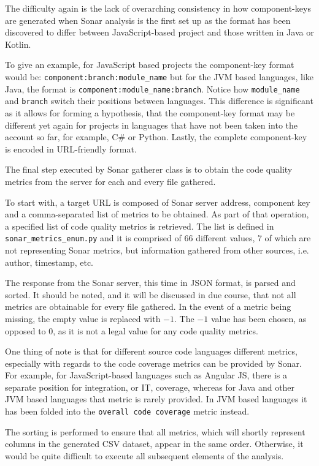 The difficulty again is the lack of overarching consistency in how component-keys are generated when Sonar analysis is the first set up as the format has been discovered to differ between JavaScript-based project and those written in Java or Kotlin.

To give an example, for JavaScript based projects the component-key format would be:
\texttt{component:branch:module\_name} but for the JVM based languages, like Java, the format is
\texttt{component:module\_name:branch}.
Notice how \texttt{module\_name} and \texttt{branch} switch their positions between languages.
This difference is significant as it allows for forming a hypothesis, that the component-key format may be different yet again for projects in languages that have not been taken into the account so far, for example, C\# or Python.
Lastly, the complete component-key is encoded in URL-friendly format.

The final step executed by Sonar gatherer class is to obtain the code quality metrics from the server for each and every file gathered. 

To start with, a target URL is composed of Sonar server address, component key and a comma-separated list of metrics to be obtained. As part of that operation, a specified list of code quality metrics is retrieved. The list is defined in \texttt{sonar\_metrics\_enum.py} and it is comprised of 66 different values, 7 of which are not representing Sonar metrics, but information gathered from other sources, i.e. author, timestamp, etc. 

The response from the Sonar server, this time in JSON format, is parsed and sorted. It should be noted, and it will be discussed in due course, that not all metrics are obtainable for every file gathered. In the event of a metric being missing, the empty value is replaced with $-1$. The $-1$ value has been chosen, as opposed to $0$, as it is not a legal value for any code quality metrics. 

One thing of note is that for different source code languages different metrics, especially with regards to the code coverage metrics can be provided by Sonar. For example, for JavaScript-based languages such as Angular JS, there is a separate position for integration, or IT, coverage, whereas for Java and other JVM based languages that metric is rarely provided. In JVM based languages it has been folded into the \texttt{overall code coverage} metric instead.

The sorting is performed to ensure that all metrics, which will shortly represent columns in the generated CSV dataset, appear in the same order. Otherwise, it would be quite difficult to execute all subsequent elements of the analysis.

